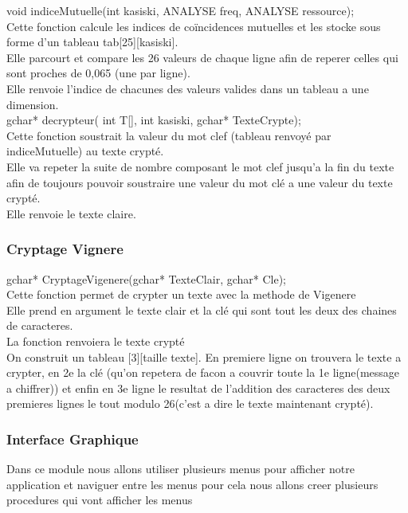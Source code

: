\documentclass[a4]{article}
\begin{document}
	void indiceMutuelle(int kasiski, ANALYSE freq, ANALYSE ressource);\\
		Cette fonction calcule les indices de coïncidences mutuelles et les stocke sous forme d'un tableau tab[25][kasiski].\\
		Elle parcourt et compare les 26 valeurs de chaque ligne afin de reperer celles qui sont proches de 0,065 (une par ligne).\\
		Elle renvoie l'indice de chacunes des valeurs valides dans un tableau a une dimension. \\
	
	gchar* decrypteur( int T[], int kasiski, gchar* TexteCrypte);\\
		Cette fonction soustrait la valeur du mot clef (tableau renvoyé par indiceMutuelle) au texte crypté.\\
		Elle va repeter la suite de nombre composant le mot clef jusqu'a la fin du texte afin de toujours pouvoir
		soustraire une valeur du mot clé a une valeur du texte crypté.\\
		Elle renvoie le texte claire.\\
		
		\subsubsection{Cryptage Vignere}
	gchar* CryptageVigenere(gchar* TexteClair, gchar* Cle);\\
		Cette fonction permet de crypter un texte avec la methode de Vigenere\\
		Elle prend en argument le texte clair et la clé qui sont tout les deux des chaines de caracteres.\\
		La fonction renvoiera le texte crypté\\
		On construit un tableau [3][taille texte]. En premiere ligne on trouvera le texte a crypter, 
		en 2e la clé (qu'on repetera de facon a couvrir toute la 1e ligne(message a chiffrer)) et enfin 
		en 3e ligne le resultat de l'addition des caracteres des deux premieres lignes le tout modulo 
		26(c'est a dire le texte maintenant crypté).
		
		\subsubsection{Interface Graphique}
		Dans ce module nous allons utiliser plusieurs menus pour afficher notre application et naviguer 
		entre les menus pour cela nous allons creer plusieurs procedures qui vont afficher les menus  
		
\end{document}

